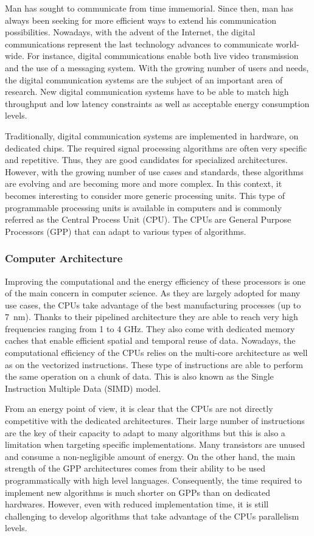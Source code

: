 Man has sought to communicate from time immemorial. Since then, man has always
been seeking for more efficient ways to extend his communication possibilities.
Nowadays, with the advent of the Internet, the digital communications represent
the last technology advances to communicate world-wide. For instance, digital
communications enable both live video transmission and the use of a messaging
system. With the growing number of users and needs, the digital communication
systems are the subject of an important area of research. New digital
communication systems have to be able to match high throughput and low latency
constraints as well as acceptable energy consumption levels.

Traditionally, digital communication systems are implemented in hardware, on
dedicated chips. The required signal processing algorithms are often very
specific and repetitive. Thus, they are good candidates for specialized
architectures. However, with the growing number of use cases and standards,
these algorithms are evolving and are becoming more and more complex. In this
context, it becomes interesting to consider more generic processing units.
This type of programmable processing units is available in computers and is
commonly referred as the Central Process Unit (CPU). The CPUs are General
Purpose Processors (GPP) that can adapt to various types of algorithms.

\subsubsection*{Computer Architecture}

Improving the computational and the energy efficiency of these processors is one
of the main concern in computer science. As they are largely adopted for many
use cases, the CPUs take advantage of the best manufacturing processes (up to
7~nm). Thanks to their pipelined architecture they are able to reach very high
frequencies ranging from 1 to 4 GHz. They also come with dedicated memory caches
that enable efficient spatial and temporal reuse of data. Nowadays, the
computational efficiency of the CPUs relies on the multi-core architecture as
well as on the vectorized instructions. These type of instructions are able to
perform the same operation on a chunk of data. This is also known as the Single
Instruction Multiple Data (SIMD) model.

From an energy point of view, it is clear that the CPUs are not directly
competitive with the dedicated architectures. Their large number of instructions
are the key of their capacity to adapt to many algorithms but this is also a
limitation when targeting specific implementations. Many transistors are
unused and consume a non-negligible amount of energy. On the other hand, the
main strength of the GPP architectures comes from their ability to be used
programmatically with high level languages. Consequently, the time required to
implement new algorithms is much shorter on GPPs than on dedicated hardwares.
However, even with reduced implementation time, it is still challenging to
develop algorithms that take advantage of the CPUs parallelism levels.

